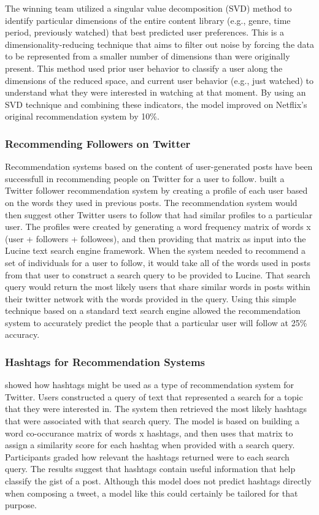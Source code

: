 \documentclass[man,floatsintext]{apa6}
\begin{document}
The winning team utilized a singular value decomposition (SVD) method to identify particular dimensions of the entire content library (e.g., genre, time period, previously watched) that best predicted user preferences.
This is a dimensionality-reducing technique that aims to filter out noise by forcing the data to be represented from a smaller number of dimensions than were originally present.
This method used prior user behavior to classify a user along the dimensions of the reduced space, and current user behavior (e.g., just watched) to understand what they were interested in watching at that moment.
By using an SVD technique and combining these indicators, the model improved on Netflix's original recommendation system by 10\%.

\subsubsection{Recommending Followers on Twitter}

Recommendation systems based on the content of user-generated posts have been successfull in recommending people on Twitter for a user to follow.
\textcite{Hannon2010} built a Twitter follower recommendation system by creating a profile of each user based on the words they used in previous posts.
The recommendation system would then suggest other Twitter users to follow that had similar profiles to a particular user.
The profiles were created by generating a word frequency matrix of words x (user + followers + followees), and then providing that matrix as input into the Lucine text search engine framework.
When the system needed to recommend a set of individuals for a user to follow, it would take all of the words used in posts from that user to construct a search query to be provided to Lucine.
That search query would return the most likely users that share similar words in posts within their twitter network with the words provided in the query.
Using this simple technique based on a standard text search engine allowed the recommendation system to accurately predict the people that a particular user will follow at 25\% accuracy.

\subsubsection{Hashtags for Recommendation Systems}

\textcite{Efron2010} showed how hashtags might be used as a type of recommendation system for Twitter.
Users constructed a query of text that represented a search for a topic that they were interested in.
The system then retrieved the most likely hashtags that were associated with that search query.
The model is based on building a word co-occurance matrix of words x hashtags, and then uses that matrix to assign a similarity score for each hashtag when provided with a search query.
Participants graded how relevant the hashtags returned were to each search query.
The results suggest that hashtags contain useful information that help classify the gist of a post. 
Although this model does not predict hashtags directly when composing a tweet, a model like this could certainly be tailored for that purpose.
\end{document}
